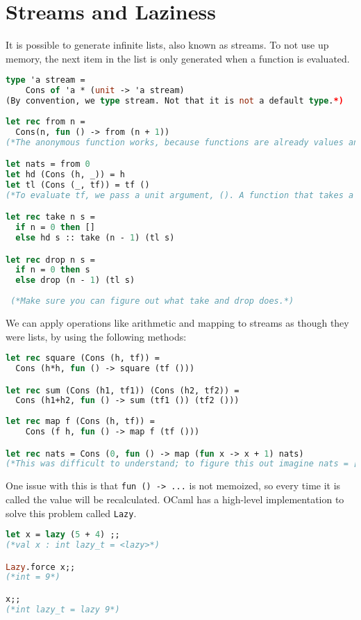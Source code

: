 \documentclass[12pt,a4paper]{article} %
\begin{document}
\section{Streams and Laziness}
It is possible to generate infinite lists, also known as streams. To not use up memory, the next item in the list is only generated when a function is evaluated.
\begin{lstlisting}[language=Caml]
type 'a stream =
    Cons of 'a * (unit -> 'a stream)
(By convention, we type stream. Not that it is not a default type.*)
    
let rec from n =
  Cons(n, fun () -> from (n + 1))
(*The anonymous function works, because functions are already values and do not get evaluated until a value is fed in. Hence, the following iterations of from (n + 1) are not evaluated.*)

let nats = from 0
let hd (Cons (h, _)) = h
let tl (Cons (_, tf)) = tf ()
(*To evaluate tf, we pass a unit argument, (). A function that takes a unit argument is called a thunk.*)

let rec take n s =
  if n = 0 then []
  else hd s :: take (n - 1) (tl s)

let rec drop n s =
  if n = 0 then s
  else drop (n - 1) (tl s)
  
 (*Make sure you can figure out what take and drop does.*)
\end{lstlisting}
We can apply operations like arithmetic and mapping to streams as though they were lists, by using the following methods:
\begin{lstlisting}[language=Caml]
let rec square (Cons (h, tf)) = 
  Cons (h*h, fun () -> square (tf ()))

let rec sum (Cons (h1, tf1)) (Cons (h2, tf2)) =
  Cons (h1+h2, fun () -> sum (tf1 ()) (tf2 ()))
  
let rec map f (Cons (h, tf)) = 
	Cons (f h, fun () -> map f (tf ()))

let rec nats = Cons (0, fun () -> map (fun x -> x + 1) nats)
(*This was difficult to understand; to figure this out imagine nats = [0; 1; 2; 3;...]. Then map (fun x -> x + 1) nats = [1; 2; 3; 4;...].*)
\end{lstlisting}
One issue with this is that \verb|fun () -> ...| is not memoized, so every time it is called the value will be recalculated. OCaml has a high-level implementation to solve this problem called \verb|Lazy|.
\begin{lstlisting}[language=Caml]
let x = lazy (5 + 4) ;;
(*val x : int lazy_t = <lazy>*)

Lazy.force x;;
(*int = 9*)

x;;
(*int lazy_t = lazy 9*)
\end{lstlisting}
\end{document}
